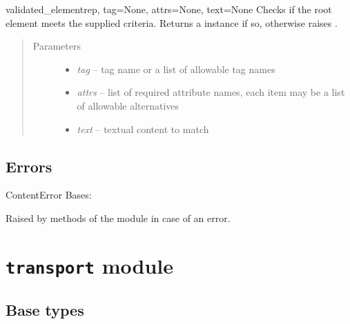 \documentclass[a4paper,10pt,english]{manual}
\begin{document}
\hypertarget{ncclient.content.validated_element}{}\begin{funcdesc}{validated\_element}{rep, tag=None, attrs=None, text=None}
Checks if the root element meets the supplied criteria. Returns a \href{http://docs.python.org/library/xml.etree.elementtree.html\#xml.etree.ElementTree.Element}{} instance if so, otherwise raises \hyperlink{ncclient.content.ContentError}{}.
\begin{quote}\begin{description}
\item[Parameters]\begin{itemize}
\item {} 
\emph{tag} -- tag name or a list of allowable tag names

\item {} 
\emph{attrs} -- list of required attribute names, each item may be a list of allowable alternatives

\item {} 
\emph{text} -- textual content to match

\end{itemize}

\end{description}\end{quote}
\end{funcdesc}


\subsection{Errors}

\hypertarget{ncclient.content.ContentError}{}\begin{excdesc}{ContentError}
Bases: 

Raised by methods of the  module in case of an error.
\end{excdesc}

\resetcurrentobjects
\hypertarget{--doc-userdoc/transport}{}

\section{\texttt{transport} module}
\hypertarget{module-ncclient.transport}{}

\subsection{Base types}
\end{document}
